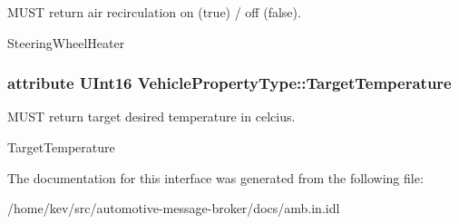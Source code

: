 M\+U\+S\+T return air recirculation on (true) / off (false). 

Steering\+Wheel\+Heater \hypertarget{interfaceVehiclePropertyType_a8f6c68afc7aeb0334a22737b3e16abfa}{
\subsubsection[{Target\+Temperature}]{\setlength{\rightskip}{0pt plus 5cm}attribute U\+Int16 Vehicle\+Property\+Type\+::\+Target\+Temperature}}\label{interfaceVehiclePropertyType_a8f6c68afc7aeb0334a22737b3e16abfa}


M\+U\+S\+T return target desired temperature in celcius. 

Target\+Temperature 

The documentation for this interface was generated from the following file\+:\begin{DoxyCompactItemize}
\item 
/home/kev/src/automotive-\/message-\/broker/docs/amb.\+in.\+idl\end{DoxyCompactItemize}

